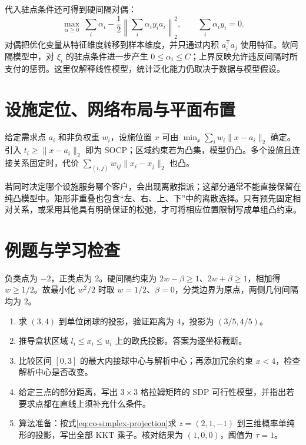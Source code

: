 代入驻点条件还可得到硬间隔对偶：
\[
 \max_{\alpha\geq0}\
 \sum_i\alpha_i-\frac12\left\|\sum_i\alpha_i y_i a_i\right\|_2^2,
 \qquad \sum_i\alpha_i y_i=0.
\]
对偶把优化变量从特征维度转移到样本维度，并只通过内积 $a_i^{\mathsf T}a_j$ 使用特征。软间隔模型中，对 $\xi_i$ 的驻点条件进一步产生 $0\leq\alpha_i\leq C$；上界反映允许违反间隔时所支付的惩罚。这里仅解释线性模型，统计泛化能力仍取决于数据与模型假设。

\section{设施定位、网络布局与平面布置}

给定需求点 $a_i$ 和非负权重 $w_i$，设施位置 $x$ 可由 $\min_x\sum_iw_i\|x-a_i\|_2$ 确定。引入 $t_i\geq\|x-a_i\|_2$ 即为 SOCP；区域约束若为凸集，模型仍凸。多个设施且连接关系固定时，代价 $\sum_{(i,j)}w_{ij}\|x_i-x_j\|_2$ 也凸。

若同时决定哪个设施服务哪个客户，会出现离散指派；这部分通常不能直接保留在纯凸模型中。矩形非重叠也包含“左、右、上、下”中的离散选择。只有预先固定相对关系，或采用其他具有明确保证的松弛，才可将相应位置限制写成单组凸约束。

\section{例题与学习检查}
\begin{example}[一维最大间隔]
负类点为 $-2$，正类点为 $2$。硬间隔约束为 $2w-\beta\geq1$、$2w+\beta\geq1$，相加得 $w\geq1/2$。故最小化 $w^2/2$ 时取 $w=1/2$、$\beta=0$，分类边界为原点，两侧几何间隔均为 $2$。
\end{example}
\begin{enumerate}
 \item 求 $(3,4)$ 到单位闭球的投影，验证距离为 $4$，投影为 $(3/5,4/5)$。
 \item 推导盒状区域 $l_i\leq x_i\leq u_i$ 上的欧氏投影。答案为逐坐标截断。
 \item 比较区间 $[0,3]$ 的最大内接球中心与解析中心；再添加冗余约束 $x<4$，检查解析中心是否改变。
 \item 给定三点的部分距离，写出 $3\times3$ 格拉姆矩阵的 SDP 可行性模型，并指出若要求点都在直线上须补充什么条件。
 \item 算法准备：按式\eqref{eq:co-simplex-projection}求 $z=(2,1,-1)$ 到三维概率单纯形的投影，写出全部 KKT 乘子。核对结果为 $(1,0,0)$，阈值为 $\tau=1$。
\end{enumerate}

